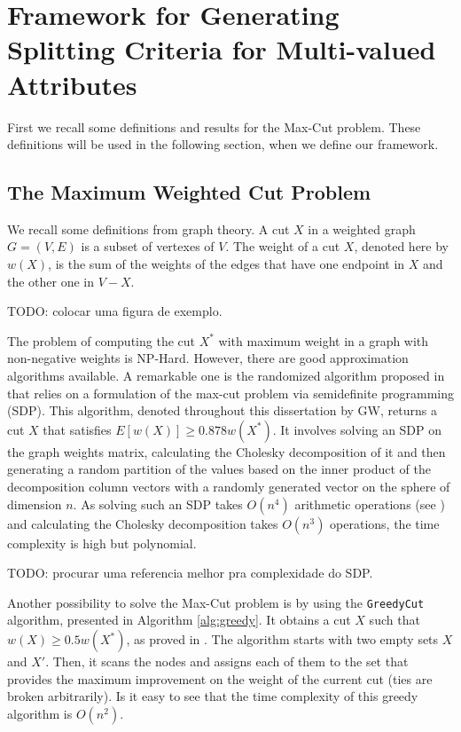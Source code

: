 \newpage

\chapter{Framework for Generating Splitting Criteria for Multi-valued Attributes}
\label{chap:framework}

First we recall some definitions and results for the Max-Cut problem. These definitions will be used in the following section, when we define our framework.

\section{The Maximum Weighted Cut Problem}
\label{sec:maxcutbackground}

We  recall some definitions from graph theory. A cut  $X$ in  a weighted graph $G=(V,E)$ is
a subset of vertexes of $V$. The weight of a cut $X$, denoted here by $w(X)$, is the sum of the weights
of the edges that have one endpoint in $X$ and the other one in $V-X$.

TODO: colocar uma figura de exemplo.

The problem of computing the  cut $X^*$ with maximum weight in a graph with non-negative weights is NP-Hard.
However, there are good  approximation algorithms
available. A remarkable one is the randomized algorithm
 proposed in  \cite{GoeWil95} that relies on a formulation of
the max-cut problem via semidefinite programming (SDP). This algorithm,  denoted throughout this dissertation by GW, 
returns a cut $X$ that satisfies  $E[w(X)] \ge 0.878 w(X^*)$. It involves solving an SDP on the graph weights matrix, calculating the Cholesky decomposition of it and then generating a random partition of the values based on the inner product of the decomposition column vectors with a randomly generated vector on the sphere of dimension $n$. As solving such an SDP takes $O(n^4)$ arithmetic operations (see \cite{navascues2009power}) and calculating the Cholesky decomposition takes $O(n^3)$ operations, the time complexity is high but polynomial.

TODO: procurar uma referencia melhor pra complexidade do SDP.

Another possibility to solve the Max-Cut problem is by using the {\tt GreedyCut} algorithm, presented in Algorithm \ref{alg:greedy}. It
obtains a cut $X$ such that $w(X)  \ge 0.5 w(X^*)$, as proved in \cite{SahGon:76}.
The algorithm starts with two empty sets $X$ and $X'$. Then, it
scans the nodes 
and assigns each of them to the set that provides
the maximum improvement on  the weight of the current cut (ties are broken arbitrarily). Is it easy to see that the time complexity of this greedy algorithm is $O(n^2)$.



